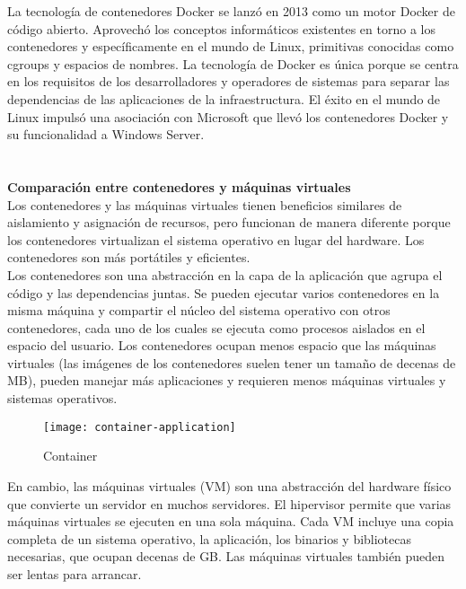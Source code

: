 \documentclass[ spanish, a4paper, 12pt, oneside]{report}
\begin{document}
La tecnología de contenedores Docker se lanzó en 2013 como un motor Docker de código abierto. Aprovechó los conceptos 
informáticos existentes en torno a los contenedores y específicamente en el mundo de Linux, primitivas conocidas como 
cgroups y espacios de nombres. La tecnología de Docker es única porque se centra en los requisitos de los desarrolladores 
y operadores de sistemas para separar las dependencias de las aplicaciones de la infraestructura.
El éxito en el mundo de Linux impulsó una asociación con Microsoft que llevó los contenedores Docker y su funcionalidad 
a Windows Server.\\ \\ \\

\textbf{Comparación entre contenedores y máquinas virtuales}\\
Los contenedores y las máquinas virtuales tienen beneficios similares de aislamiento y asignación de recursos, pero 
funcionan de manera diferente porque los contenedores virtualizan el sistema operativo en lugar del hardware. 
Los contenedores son más portátiles y eficientes.\\

Los contenedores son una abstracción en la capa de la aplicación que agrupa el código y las dependencias juntas. 
Se pueden ejecutar varios contenedores en la misma máquina y compartir el núcleo del sistema operativo con otros 
contenedores, cada uno de los cuales se ejecuta como procesos aislados en el espacio del usuario. Los contenedores ocupan 
menos espacio que las máquinas virtuales (las imágenes de los contenedores suelen tener un tamaño de decenas de MB), 
pueden manejar más aplicaciones y requieren menos máquinas virtuales y sistemas operativos.\\

\begin{figure}[!h]
   \centering
   \texttt{[image: container-application]}\\
      \caption{\label{fig: container} Container}
\end{figure}


En cambio, las máquinas virtuales (VM) son una abstracción del hardware físico que convierte un servidor en muchos 
servidores. El hipervisor permite que varias máquinas virtuales se ejecuten en una sola máquina. Cada VM incluye una 
copia completa de un sistema operativo, la aplicación, los binarios y bibliotecas necesarias, que ocupan decenas de GB. 
Las máquinas virtuales también pueden ser lentas para arrancar.\\
\end{document}
